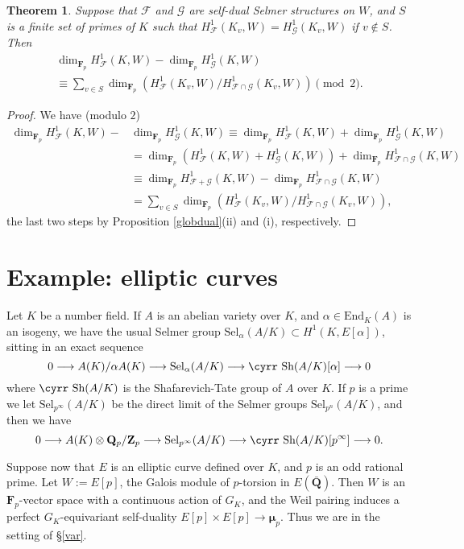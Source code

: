 \documentclass[reqno]{amsart}
\newtheorem{thm}{Theorem}[section]
\theoremstyle{definition}
\def\Sh{\mbox{\cyrr Sh}}
\def\Z{\mathbf{Z}}
\def\Q{\mathbf{Q}}
\def\F{\mathbf{F}}
\def\Zp{\Z_p}
\def\Qp{\Q_p}
\def\Fp{\F_p}
\def\cF{\mathcal{F}}
\def\cG{\mathcal{G}}
\def\T{W}
\def\End{\mathrm{End}}
\def\too{\longrightarrow}
\def\Sel{\mathrm{Sel}}
\def\Hs#1{H^1_{#1}}
\def\HF{\Hs{\cF}}
\def\HG{\Hs{\cG}}
\def\bmu{\boldsymbol{\mu}}
\def\rf{\Fp}
\begin{document}
\begin{thm}
\label{fg}
Suppose that $\cF$ and $\cG$ are self-dual Selmer structures on $\T$, and 
$S$ is a finite set of primes of $K$ 
such that $\HF(K_v,\T) = \HG(K_v,\T)$ if $v \notin S$.  Then
\begin{multline*}
\dim_{\rf}\HF(K,\T) - \dim_{\rf}\HG(K,\T) \\ \equiv \sum_{v \in S} 
    \dim_{\rf}(\HF(K_v,\T)/\Hs{\cF\cap\cG}(K_v,\T)) \pmod{2}.
\end{multline*}
\end{thm}

\begin{proof}
We have (modulo $2$)
\begin{align*}
\dim_{\rf} \HF(K,\T) - &\dim_{\rf} \HG(K,\T) 
    \equiv \dim_{\rf} \HF(K,\T) + \dim_{\rf} \HG(K,\T) \\
    &= \dim_{\rf} (\HF(K,\T) + \HG(K,\T)) + \dim_{\rf} \Hs{\cF\cap\cG}(K,\T) \\
    &\equiv \dim_{\rf}\Hs{\cF+\cG}(K,\T) - \dim_{\rf}\Hs{\cF\cap\cG}(K,\T) \\
    &=  \sum_{v \in S}\dim_{\rf}(\HF(K_v,\T)/\Hs{\cF\cap\cG}(K_v,\T)),
\end{align*}
the last two steps by Proposition \ref{globdual}(ii) and (i), respectively.
\end{proof}

\section{Example: elliptic curves}
\label{ecx}
Let $K$ be a number field.
If $A$ is an abelian variety over $K$, and $\alpha \in \End_K(A)$ is 
an isogeny, we have the usual Selmer group $\Sel_\alpha(A/K) \subset H^1(K,E[\alpha])$, 
sitting in an exact sequence  
\begin{equation}
\label{selE}
0 \too A(K)/\alpha A(K) \too \Sel_\alpha(A/K) \too \Sh(A/K)[\alpha] \too 0
\end{equation}
where $\Sh(A/K)$ is the Shafarevich-Tate group of $A$ over $K$.
If $p$ is a prime we let $\Sel_{p^\infty}(A/K)$ be the direct limit of the 
Selmer groups $\Sel_{p^n}(A/K)$, and then we have
\begin{equation}
\label{selEinf}
0 \too A(K) \otimes \Qp/\Zp \too \Sel_{p^\infty}(A/K) 
    \too \Sh(A/K)[p^\infty] \too 0.
\end{equation}

Suppose now that $E$ is an elliptic curve defined over $K$, 
and $p$ is an odd rational prime.  
Let $\T := E[p]$, the Galois module of $p$-torsion in $E(\bar{\Q})$.  
Then $\T$ is an $\rf$-vector space with a continuous action of $G_K$, 
and the Weil pairing induces a perfect $G_K$-equivariant self-duality 
$E[p] \times E[p] \to \bmu_p$.  Thus we are in the setting of \S\ref{var}.
\end{document}
